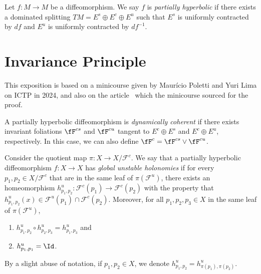 \documentclass[../main]{subfiles}
\begin{document}
\begin{definition}
  Let \(f \colon M \to M\) be a diffeomorphism. We say \(f\) is \emph{partially hyperbolic} if there exists a dominated splitting \(TM = E^s \oplus E^c \oplus E^u\) such that \(E^s\) is uniformly contracted by \(df\) and \(E^u\) is uniformly contracted by \(df ^{-1}\).
\end{definition}

\section{Invariance Principle}

This exposition is based on a minicourse given by Maurício Poletti and Yuri Lima on ICTP in 2024, and also on the article~\cite{tahzibiInvariancePrincipleRigidity2018} which the minicourse sourced for the proof.


\begin{definition}
  A partially hyperbolic diffeomorphism is \textit{dynamically coherent} if there exists invariant foliations \(\fF^{cs}\) and \(\fF^{cu}\) tangent to \(E^c \oplus E^s\) and \(E^c \oplus E^u\), respectively. In this case, we can also define \(\fF^c = \fF^{cs}\vee \fF^{cu}\).
\end{definition}

\begin{definition}
  Consider the quotient map \(\pi \colon X \to X/\mathcal{F}^c\). We say that a partially hyperbolic diffeomorphism \(f \colon X \to X\) has \emph{global unstable holonomies} if for every \(p_1,p_2 \in X/\mathcal{F}^c\) that are in the same leaf of \(\pi(\mathcal{F}^{u})\), there exists an homeomorphism \(h^u_{p_1,p_2}\colon \mathcal{F}^c(p_1) \to \mathcal{F}^c(p_2)\) with the property that \(h^u_{p_1,p_2}(x) \in \mathcal{F}^u(p_1) \cap \mathcal{F}^c(p_2)\). Moreover, for all \(p_1,p_2,p_3 \in X\) in the same leaf of \(\pi(\mathcal{F}^{u})\),
  \begin{enumerate}
  \item \(h^u_{p_1,p_2} \circ h^u_{p_2,p_3} = h^u_{p_1,p_3}\) and
  \item \(h^u_{p_1,p_1} = \Id\).
  \end{enumerate}
  By a slight abuse of notation, if \(p_1,p_2 \in X\), we denote \(h^u_{p_1,p_2} = h^u_{\pi(p_1),\pi(p_2)}\).
\end{definition}
\end{document}
